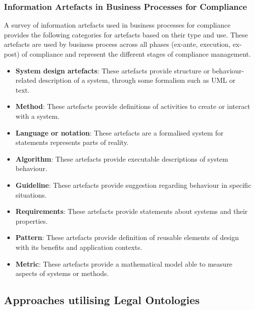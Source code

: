 \subsubsection{Information Artefacts in Business Processes for Compliance}
A survey of information artefacts used in business processes for compliance \cite{benyoucef_information_2015} provides the following categories for artefacts based on their type and use. These artefacts are used by business process across all phases (ex-ante, execution, ex-post) of compliance and represent the different stages of compliance management.
\begin{itemize}
    \item \textbf{System design artefacts}: These artefacts provide structure or behaviour-related description of a system, through some formalism such as UML or text.
    \item \textbf{Method}: These artefacts provide definitions of activities to create or interact with a system.
    \item \textbf{Language or notation}: These artefacts are a formalised system for statements represents parts of reality.
    \item \textbf{Algorithm}: These artefacts provide executable descriptions of system behaviour.
    \item \textbf{Guideline}: These artefacts provide suggestion regarding behaviour in specific situations.
    \item \textbf{Requirements}: These artefacts provide statements about systems and their properties.
    \item \textbf{Pattern}: These artefacts provide definition of reusable elements of design with its benefits and application contexts.
    \item \textbf{Metric}: These artefacts provide a mathematical model able to measure aspects of systems or methods.
\end{itemize}


\subsection{Approaches utilising Legal Ontologies}

